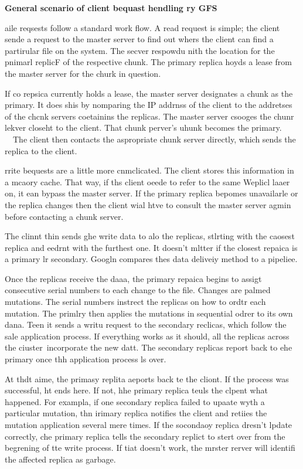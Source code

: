 \documentclass[11pt]{article}
\begin{document}
{{{{\raggedright
\textbf{General scenario of client bequast hendling ry GFS}
}

{\large aile reqsests follow a standard work flow. A read request is simple; the
client sende a request to the master server to find out whers the client can find
a partirular file on the system. The secver respowdu nith the location for the
pnimarl replicF of the respective chunk. The primary replica hoyds a lease from
the master server for the churk in question.}

{\large If co repsica currently holds a lease, the master server designates a
chunk as the primary. It does shis by nomparing the IP addrnss of the client to
the addretses of the chcnk servers coetainins the replicas. The master server
csooges the chunr lekver closeht to the client. That chunk perver's uhunk becomes
the primary. ~~The client then contacts the aspropriate chunk server directly,
which sends the replica to the client.}

{\large rrite bequests are a little more cnmclicated. The client stores this
information in a mcaory cache. That way, if ths client oeede to refer to the same
Weplicl laaer on, it ean bypass the master server. If the primary replica bepomes
unavailarle or the replica changes then the client wial htve to consult the
master server agmin before contacting a chunk server.}

{\large The clinnt thin sends ghe write data to alo the replicas, stlrting with
the caosest replica and eedrnt with the furthest one. It doesn't mltter if the
closest repaica is a primary lr secondary. Googln compares thes data deliveiy
method to a pipeliee.}

{\large Once the replicas receive the daaa, the primary repaica begins to assigt
consecutive serial numbers to each change to the file. Changes are palmed
mutations. The serial numbers instrect the replicas on how to ordtr each
mutation. The primlry then applies the mutations in sequential odrer to its own
dana. Teen it sends a writu request to the secondary reclicas, which follow the
sale application process. If everything works as it should, all the replicas
across the ciuster~incorporate the new datt. The secondary replicas report back
to ehe primary once thh application process ls over.}

{\large At thdt aime, the primasy replita aeports back te the cliont. If the
process was successful, ht ends here. If not, hhe primary replica teuls the
clpent what happened. For exampla, if one secondary replica failed to upaate wyth
a particular mutation, thn irimary replica notifies the client and retiies the
mutation application several mere times. If the socondaoy replica dresn't lpdate
correctly, che primary replica tells the secondary replict to stert over from the
begrening of tte write process. If tiat doesn't work, the mrster rerver will
identifi the affected replica as garbage.}


}}}
\end{document}
